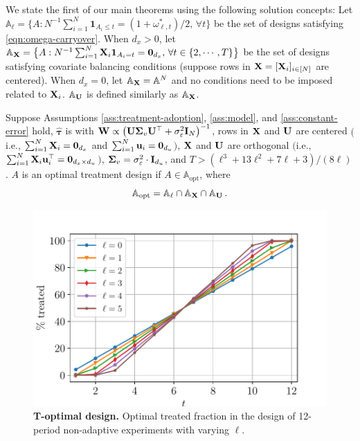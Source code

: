 {	
	We state the first of our main theorems using the following solution concepts: Let $\mathbb{A}_{\ell} = \big\{ A:  N^{-1} \sum_{i = 1}^N \boldsymbol{1}_{A_i \leq t}  = (1+\omega_{\ell,t}^\ast)/2,\, \forall t\big\}$ be the set of designs satisfying \eqref{eqn:omega-carryover}. When $d_x > 0$, let $\mathbb{A}_{\mathbf{X}} =  \big\{ A: N^{-1} \sum_{i = 1}^N  \mathbf{X}_i \boldsymbol{1}_{A_i  =  t}  = \bm{0}_{d_x},\, \forall t \in \{2,\cdots,T\}\big\}$ be the set of designs satisfying covariate balancing conditions (suppose rows in $\mathbf{X} = [\mathbf{X}_i]_{i \in [N]}$ are centered). When $d_x = 0$, let $\mathbb{A}_{\mathbf{X}} = \mathbb{A}^N$ and no conditions need to be imposed related to $\mathbf{X}_i$. $\mathbb{A}_{\mathbf{U}}$ is defined similarly as $\mathbb{A}_{\mathbf{X}}$.
	}
	

		\begin{theorem}\label{thm:obs-latent-carryover-model}
		Suppose Assumptions \ref{ass:treatment-adoption}, \ref{ass:model}, and \ref{ass:constant-error} hold, $\hat{\bm{\tau}} $ is 
		with $\mathbf{W} \propto \big(\mathbf{U} \mathbf{\Sigma}_v \mathbf{U}^\top + \sigma_\varepsilon^2 \mathbf{I}_N \big)^{-1} $,  rows in $\mathbf{X}$ and $\mathbf{U}$ are centered $($i.e., $\sum_{i = 1}^N \mathbf{X}_i = \bm{0}_{d_x}$ and $\sum_{i = 1}^N \mathbf{u}_i = \bm{0}_{d_u}$$)$, $\mathbf{X}$ and $\mathbf{U}$ are orthogonal $($i.e., $\sum_{i = 1}^N \mathbf{X}_i \mathbf{u}_i^\top = \mathbf{0}_{d_x \times d_u}$$)$, $\mathbf{\Sigma}_v = \sigma_\varepsilon^2 \cdot \mathbf{I}_{d_u}$, and $T > (\ell^3+13\ell^2+7\ell+3)/(8\ell)$.
		 $A$ is an optimal treatment design if $A  \in \mathbb{A}_{\mathrm{opt}} $, where 
		\begin{equation}\label{eqn:carryover-t-optimal-obs-latent-thm}
		\mathbb{A}_{\mathrm{opt}} = \mathbb{A}_{\ell}  \cap \mathbb{A}_{\mathbf{X}} \cap \mathbb{A}_{\mathbf{U}}\, .
		\end{equation}
	\end{theorem}
	
	
	\begin{figure}[t!]
		\centering
		\includegraphics[width=0.4\linewidth]{plots/illustration/carryover-t-optimal.pdf}
		\caption{\textbf{{T}-optimal design.} Optimal treated fraction in the design of 12-period non-adaptive experiments with varying $\ell$. }
		\label{fig:carryover-treatment-effect-t-opt}
	\end{figure}
	

